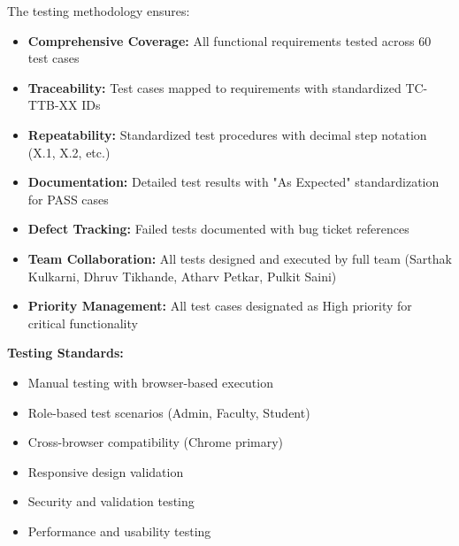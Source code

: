 The testing methodology ensures:
\begin{itemize}[leftmargin=*]
    \item \textbf{Comprehensive Coverage:} All functional requirements tested across 60 test cases
    \item \textbf{Traceability:} Test cases mapped to requirements with standardized TC-TTB-XX IDs
    \item \textbf{Repeatability:} Standardized test procedures with decimal step notation (X.1, X.2, etc.)
    \item \textbf{Documentation:} Detailed test results with "As Expected" standardization for PASS cases
    \item \textbf{Defect Tracking:} Failed tests documented with bug ticket references
    \item \textbf{Team Collaboration:} All tests designed and executed by full team (Sarthak Kulkarni, Dhruv Tikhande, Atharv Petkar, Pulkit Saini)
    \item \textbf{Priority Management:} All test cases designated as High priority for critical functionality
\end{itemize}

\textbf{Testing Standards:}
\begin{itemize}[leftmargin=*]
    \item Manual testing with browser-based execution
    \item Role-based test scenarios (Admin, Faculty, Student)
    \item Cross-browser compatibility (Chrome primary)
    \item Responsive design validation
    \item Security and validation testing
    \item Performance and usability testing
\end{itemize}
